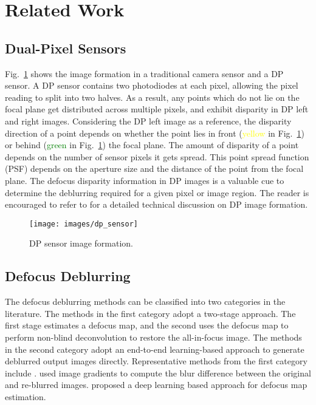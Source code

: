 \section{Related Work}
\label{sec:relatedwork}

\subsection{Dual-Pixel Sensors}
\label{subsec:dualpixelsensor}

Fig.~\ref{fig:dualpixelsensor} shows the image formation in a traditional camera sensor and a DP sensor. A DP sensor contains two photodiodes at each pixel, allowing the pixel reading to split into two halves. As a result, any points which do not lie on the focal plane get distributed across multiple pixels, and exhibit disparity in DP left and right images. Considering the DP left image as a reference, the disparity direction of a point depends on whether the point lies in front (\textcolor{yellow}{yellow} in Fig.~\ref{fig:dualpixelsensor}) or behind (\textcolor{green}{green} in Fig.~\ref{fig:dualpixelsensor}) the focal plane. The amount of disparity of a point depends on the number of sensor pixels it gets spread. This point spread function (PSF) depends on the aperture size and the distance of the point from the focal plane. The defocus disparity information in DP images is a valuable cue to determine the deblurring required for a given pixel or image region. The reader is encouraged to refer to \cite{dpdnet_eccv2020,rdpd_iccv2021} for a detailed technical discussion on DP image formation.

\begin{figure}[t]
	\centering
	\texttt{[image: images/dp\_sensor]}
	\caption{DP sensor image formation.}
	\label{fig:dualpixelsensor}
	\vspace{-14pt}
\end{figure}

\subsection{Defocus Deblurring}
\label{subsec:defocusdeblurmethods}

The defocus deblurring methods can be classified into two categories in the literature. The methods in the first category adopt a two-stage approach. The first stage estimates a defocus map, and the second uses the defocus map to perform non-blind deconvolution to restore the all-in-focus image. The methods in the second category adopt an end-to-end learning-based approach to generate deblurred output images directly. Representative methods from the first category include \cite{jnb_cvpr2015,ebdb_tip2017,dme_cvpr2019}. \cite{ebdb_tip2017} used image gradients to compute the blur difference between the original and re-blurred images. \cite{dme_cvpr2019} proposed a deep learning based approach for defocus map estimation.

